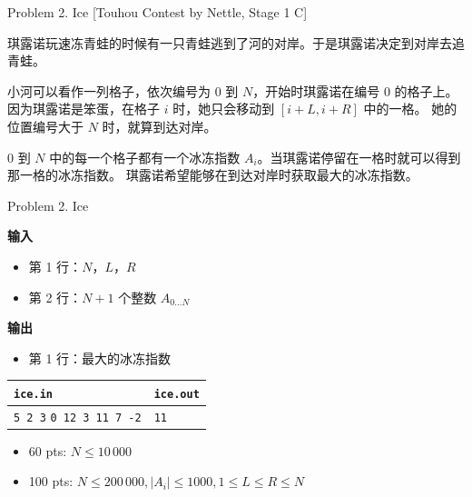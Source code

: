 \documentclass[UTF8]{beamer}
\begin{document}

\begin{frame}{Problem 2. Ice}
[Touhou Contest by Nettle, Stage 1 C]

琪露诺玩速冻青蛙的时候有一只青蛙逃到了河的对岸。于是琪露诺决定到对岸去追青蛙。

小河可以看作一列格子，依次编号为 0 到 $N$，开始时琪露诺在编号 0 的格子上。
因为琪露诺是笨蛋，在格子 $i$ 时，她只会移动到 $[i+L, i+R]$ 中的一格。
她的位置编号大于 $N$ 时，就算到达对岸。

0 到 $N$ 中的每一个格子都有一个冰冻指数 $A_i$。当琪露诺停留在一格时就可以得到那一格的冰冻指数。
琪露诺希望能够在到达对岸时获取最大的冰冻指数。

\end{frame}

\begin{frame}{Problem 2. Ice}

\textbf{输入}
\begin{itemize}
    \item 第 1 行：$N$，$L$，$R$
    \item 第 2 行：$N+1$ 个整数 $A_{0 \dots N}$
\end{itemize}
\textbf{输出}
\begin{itemize}
    \item 第 1 行：最大的冰冻指数
\end{itemize}

\begin{tabularx}{\textwidth}{|X|X|}
\hline
\texttt{\textbf{ice.in}} & \texttt{\textbf{ice.out}} \\ \hline
\texttt{5 2 3}\newline
\texttt{0 12 3 11 7 -2}
&
\texttt{11}
\\ \hline
\end{tabularx}
\newline
\begin{itemize}
    \item 60 pts: $N \leq 10\,000$
    \item 100 pts: $N \leq 200\,000, |A_i| \leq 1000, 1 \leq L \leq R \leq N$
\end{itemize}

\end{frame}
\end{document}
